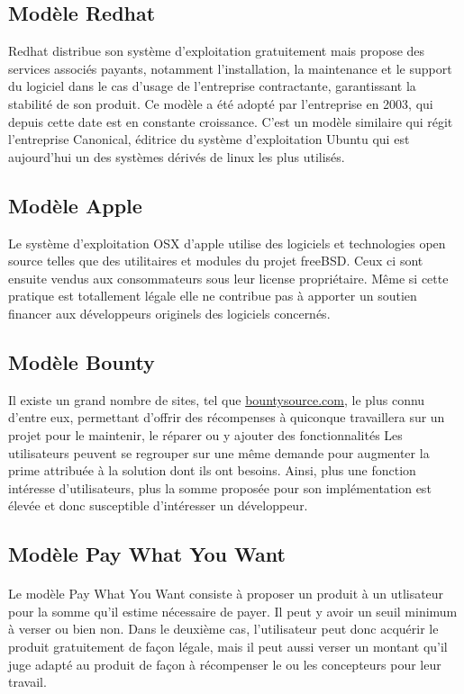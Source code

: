     \subsection{Modèle Redhat}

Redhat distribue son système d'exploitation gratuitement mais propose des 
services associés payants, notamment l'installation, la maintenance et le 
support du logiciel dans le cas d'usage de l'entreprise contractante, 
garantissant la stabilité de son produit.
Ce modèle a été adopté par l'entreprise en 2003, qui depuis cette date est en 
constante croissance.
C'est un modèle similaire qui régit l'entreprise Canonical, éditrice du 
système d'exploitation Ubuntu qui est aujourd'hui un des systèmes dérivés de 
linux les plus utilisés.

    \subsection{Modèle Apple}

Le système d'exploitation OSX d'apple utilise des logiciels et technologies 
open source telles que des utilitaires et modules du projet freeBSD\@.
Ceux ci sont ensuite vendus aux consommateurs sous leur license propriétaire. 
Même si cette pratique est totallement légale elle ne contribue pas à apporter 
un soutien financer aux développeurs originels des logiciels concernés.

    \subsection{Modèle Bounty}

Il existe un grand nombre de sites, tel que \url{bountysource.com}, le 
plus connu d'entre eux, permettant d'offrir des récompenses à quiconque 
travaillera sur un projet pour le maintenir, le réparer ou y ajouter des 
fonctionnalités
Les utilisateurs peuvent se regrouper sur une même demande pour augmenter la 
prime attribuée à la solution dont ils ont besoins.
Ainsi, plus une fonction intéresse d'utilisateurs, plus la somme proposée pour 
son implémentation est élevée et donc susceptible d'intéresser un développeur.

    \subsection{Modèle Pay What You Want}

    \paragraph{} Le modèle Pay What You Want consiste à proposer un produit à
    un utlisateur pour la somme qu'il estime nécessaire de payer. Il peut y
    avoir un seuil minimum à verser ou bien non. Dans le deuxième cas,
    l'utilisateur peut donc acquérir le produit gratuitement de façon légale,
    mais il peut aussi verser un montant qu'il juge adapté au produit de façon
    à récompenser le ou les concepteurs pour leur travail.

